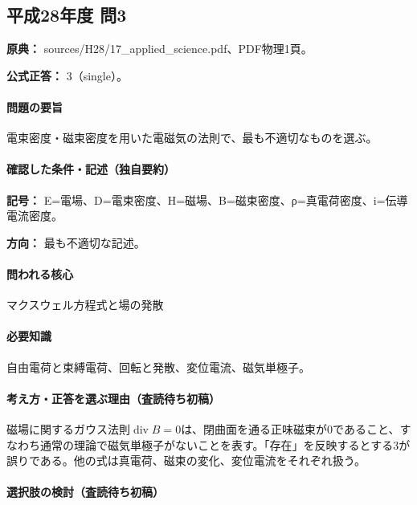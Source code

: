 \subsection{平成28年度 問3}
\label{q:h28-reg-applied-03}

\noindent\textbf{原典：} sources/H28/17\_applied\_science.pdf、PDF物理1頁。

\textbf{公式正答：} 3（single）。

\paragraph{問題の要旨} 電束密度・磁束密度を用いた電磁気の法則で、最も不適切なものを選ぶ。

\paragraph{確認した条件・記述（独自要約）}\mbox{}\par

\noindent\textbf{記号：} E=電場、D=電束密度、H=磁場、B=磁束密度、ρ=真電荷密度、i=伝導電流密度。\par

\noindent\textbf{方向：} 最も不適切な記述。\par

\paragraph{問われる核心} マクスウェル方程式と場の発散

\paragraph{必要知識} 自由電荷と束縛電荷、回転と発散、変位電流、磁気単極子。

\paragraph{考え方・正答を選ぶ理由（査読待ち初稿）} 磁場に関するガウス法則\(\operatorname{div}B=0\)は、閉曲面を通る正味磁束が0であること、すなわち通常の理論で磁気単極子がないことを表す。「存在」を反映するとする3が誤りである。他の式は真電荷、磁束の変化、変位電流をそれぞれ扱う。

\paragraph{選択肢の検討（査読待ち初稿）}\mbox{}\par

